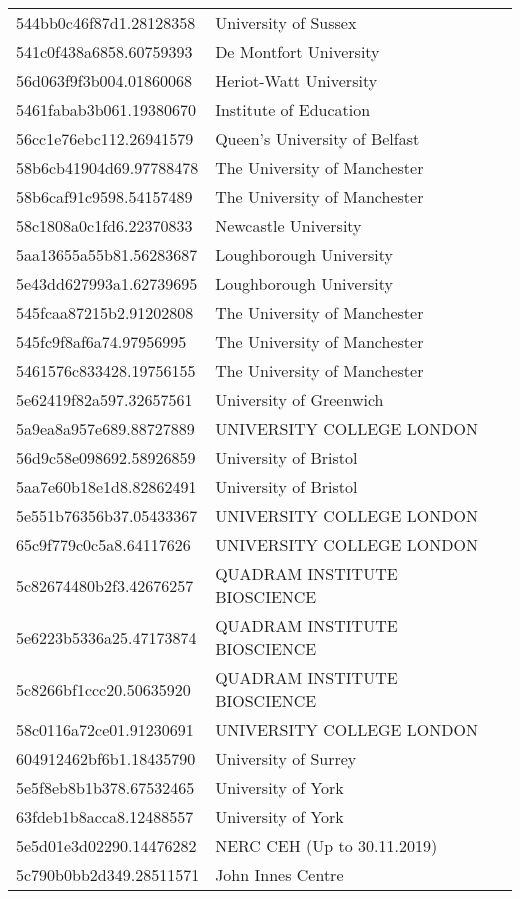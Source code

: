 \begin{tabular}{ll}
544bb0c46f87d1.28128358 & University of Sussex \\
541c0f438a6858.60759393 & De Montfort University \\
56d063f9f3b004.01860068 & Heriot-Watt University \\
5461fabab3b061.19380670 & Institute of Education \\
56cc1e76ebc112.26941579 & Queen's University of Belfast \\
58b6cb41904d69.97788478 & The University of Manchester \\
58b6caf91c9598.54157489 & The University of Manchester \\
58c1808a0c1fd6.22370833 & Newcastle University \\
5aa13655a55b81.56283687 & Loughborough University \\
5e43dd627993a1.62739695 & Loughborough University \\
545fcaa87215b2.91202808 & The University of Manchester \\
545fc9f8af6a74.97956995 & The University of Manchester \\
5461576c833428.19756155 & The University of Manchester \\
5e62419f82a597.32657561 & University of Greenwich \\
5a9ea8a957e689.88727889 & UNIVERSITY COLLEGE LONDON \\
56d9c58e098692.58926859 & University of Bristol \\
5aa7e60b18e1d8.82862491 & University of Bristol \\
5e551b76356b37.05433367 & UNIVERSITY COLLEGE LONDON \\
65c9f779c0c5a8.64117626 & UNIVERSITY COLLEGE LONDON \\
5c82674480b2f3.42676257 & QUADRAM INSTITUTE BIOSCIENCE \\
5e6223b5336a25.47173874 & QUADRAM INSTITUTE BIOSCIENCE \\
5c8266bf1ccc20.50635920 & QUADRAM INSTITUTE BIOSCIENCE \\
58c0116a72ce01.91230691 & UNIVERSITY COLLEGE LONDON \\
604912462bf6b1.18435790 & University of Surrey \\
5e5f8eb8b1b378.67532465 & University of York \\
63fdeb1b8acca8.12488557 & University of York \\
5e5d01e3d02290.14476282 & NERC CEH (Up to 30.11.2019) \\
5c790b0bb2d349.28511571 & John Innes Centre \\

\end{tabular}
